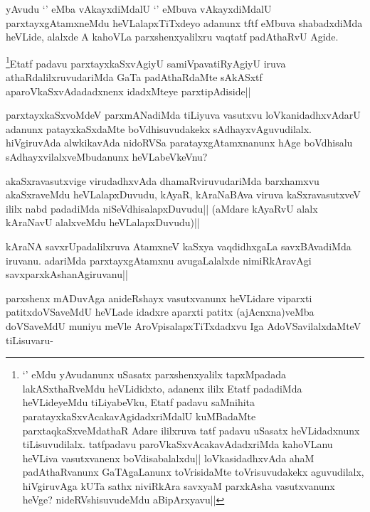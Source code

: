 
\begin{artha}
yAvudu `\stext ' eMba vAkayxdiMdalU `\stext ' eMbuva vAkayxdiMdalU parxtayxgAtamxneMdu heVLalapxTiTxdeyo adanunx tftf eMbuva shabadxdiMda heVLide, alalxde A kahoVLa parxshenxyalilxru vaqtatf padAthaRvU Agide.
\end{artha}

\begin{artha}
\footnote[1]{`\stext ' eMdu yAvudanunx uSasatx parxshenxyalilx tapxMpadada lakASxthaRveMdu heVLididxto, adanenx ililx Etatf padadiMda heVLideyeMdu tiLiyabeVku, Etatf padavu saMnihita paratayxkaSxvAcakavAgidadxriMdalU kuMBadaMte parxtaqkaSxveMdathaR Adare ililxruva tatf padavu uSasatx heVLidadxnunx tiLisuvudilalx. tatfpadavu paroVkaSxvAcakavAdadxriMda kahoVLanu heVLiva vasutxvanenx boVdisabalalxdu|| loVkasidadhxvAda ahaM padAthaRvanunx GaTAgaLanunx toVrisidaMte toVrisuvudakekx aguvudilalx, hiVgiruvAga kUTa sathx niviRkAra savxyaM parxkAsha vasutxvanunx heVge? nideRVshisuvudeMdu aBipArxyavu||}Etatf padavu parxtayxkaSxvAgiyU samiVpavatiRyAgiyU iruva athaRdalilxruvudariMda GaTa padAthaRdaMte sAkASxtf aparoVkaSxvAdadadxnenx idadxMteye parxtipAdiside||
\end{artha}


\begin{artha}
parxtayxkaSxvoMdeV parxmANadiMda tiLiyuva vasutxvu loVkanidadhxvAdarU adanunx patayxkaSxdaMte boVdhisuvudakekx sAdhayxvAguvudilalx. hiVgiruvAda alwkikavAda nidoRVSa paratayxgAtamxnanunx hAge boVdhisalu sAdhayxvilalxveMbudanunx heVLabeVkeVnu? 
\end{artha}


\begin{artha}
akaSxravasutxvige virudadhxvAda dhamaRviruvudariMda barxhamxvu akaSxraveMdu heVLalapxDuvudu, kAyaR, kAraNaBAva viruva kaSxravasutxveV ililx nabd padadiMda niSeVdhisalapxDuvudu|| (aMdare kAyaRvU alalx kAraNavU alalxveMdu heVLalapxDuvudu)||
\end{artha}


\begin{artha}
kAraNA savxrUpadalilxruva AtamxneV kaSxya vaqdidhxgaLa savxBAvadiMda iruvanu. adariMda parxtayxgAtamxnu avugaLalalxde nimiRkAravAgi savxparxkAshanAgiruvanu||

parxshenx mADuvAga anideRshayx vasutxvanunx heVLidare viparxti patitxdoVSaveMdU heVLade idadxre aparxti patitx (ajAcnxna)veMba doVSaveMdU muniyu meVle AroVpisalapxTiTxdadxvu Iga AdoVSavilalxdaMteV tiLisuvaru-
\end{artha}

